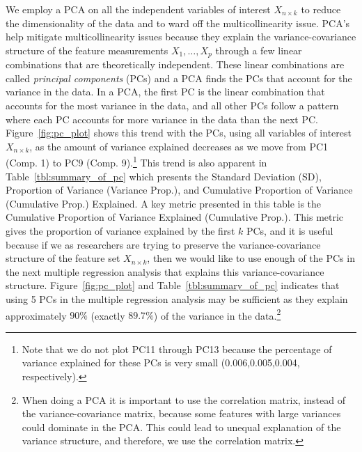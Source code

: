 \documentclass[letterpaper, 12pt]{article}
\begin{document}
	We employ a PCA on all the independent variables of interest $X_{n\times k}$ to reduce the dimensionality of the data and to ward off the multicollinearity issue.  PCA's help mitigate multicollinearity issues because they explain the variance-covariance structure of the feature measurements $X_{1}, \dots, X_{p}$ through a few linear combinations that are theoretically independent.  These linear combinations are called \textit{principal components} (PCs) and a PCA finds the PCs that account for the variance in the data.  In a PCA, the first PC is the linear combination that accounts for the most variance in the data, and all other PCs follow a pattern where each PC accounts for more variance in the data than the next PC.  Figure~\ref{fig:pc_plot} shows this trend with the PCs, using all variables of interest $X_{n\times k}$, as the amount of variance explained decreases as we move from PC1 (Comp. 1) to PC9 (Comp. 9).\footnote{Note that we do not plot PC11 through PC13 because the percentage of variance explained for these PCs is very small (0.006,0.005,0.004, respectively).}  This trend is also apparent in Table~\ref{tbl:summary_of_pc} which  presents the Standard Deviation (SD), Proportion of Variance (Variance Prop.), and Cumulative Proportion of Variance (Cumulative Prop.) Explained.  A key metric presented in this table is the Cumulative Proportion of Variance Explained (Cumulative Prop.). This metric gives the proportion of variance explained by the first $k$ PCs, and it is useful because if we as researchers are trying to preserve the variance-covariance structure of the feature set $X_{n\times k}$, then we would like to use enough of the PCs in the next multiple regression analysis that explains this  variance-covariance structure.  Figure~\ref{fig:pc_plot} and Table~\ref{tbl:summary_of_pc} indicates that using 5 PCs in the multiple regression analysis may be sufficient as they explain approximately $90 \%$ (exactly $89.7 \%$) of the variance in the data.\footnote{When doing a PCA it is important to use the correlation matrix, instead of the variance-covariance matrix, because some features with large variances could dominate in the PCA.  This could lead to unequal explanation of the variance structure, and therefore, we use the correlation matrix.}
		
\end{document}
